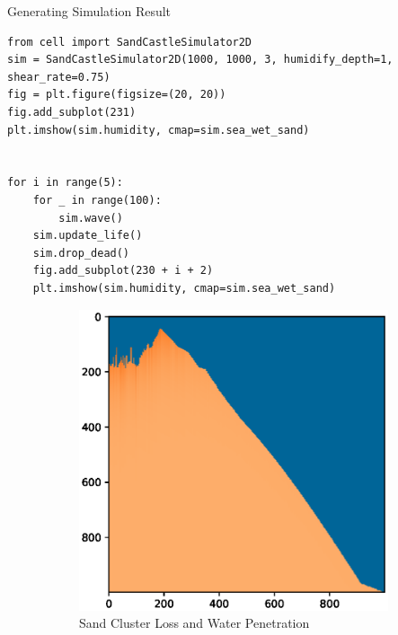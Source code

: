 \documentclass[12pt]{article}
\begin{document}
\begin{longlisting}
    \caption{Generating Simulation Result}
    \begin{verbatim}
from cell import SandCastleSimulator2D
sim = SandCastleSimulator2D(1000, 1000, 3, humidify_depth=1, shear_rate=0.75)
fig = plt.figure(figsize=(20, 20))
fig.add_subplot(231)
plt.imshow(sim.humidity, cmap=sim.sea_wet_sand)


for i in range(5):
    for _ in range(100):
        sim.wave()
    sim.update_life()
    sim.drop_dead()
    fig.add_subplot(230 + i + 2)
    plt.imshow(sim.humidity, cmap=sim.sea_wet_sand)
    \end{verbatim}
\end{longlisting}
\begin{figure}[H]
    \centering
    \begin{subfigure}[a]{\linewidth}
        \includegraphics[width=\linewidth]{Figure_1.eps}
        \caption{Sand Cluster Loss and Water Penetration}
    \end{subfigure}
    \begin{subfigure}[c]{0.7\linewidth}

\end{subfigure}
\end{figure}
\end{document}
